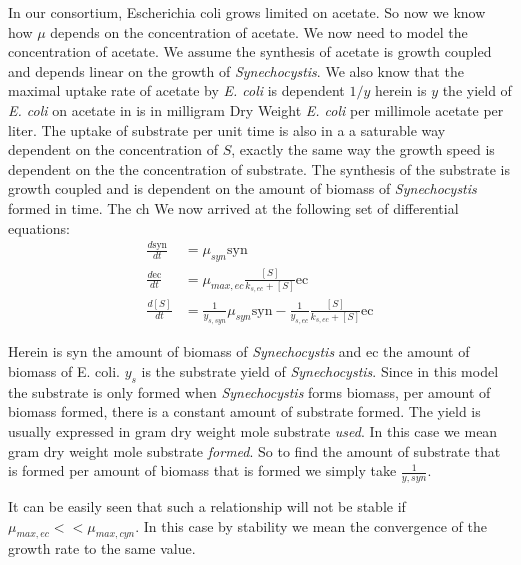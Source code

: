 \documentclass[10pt]{report}
\begin{document}
In our consortium, Escherichia coli grows limited on acetate. So now we know how $\mu$ depends on the concentration of acetate. We now need to model the concentration of acetate. We assume the synthesis of acetate is growth coupled and depends linear on the growth of \textit{Synechocystis}. We also know that the maximal uptake rate of acetate by \textit{E. coli} is dependent $1/y$ herein is $y$ the yield of \textit{E. coli} on acetate in is in milligram Dry Weight \textit{E. coli} per millimole acetate per liter. The uptake of substrate per unit time is also in a a saturable way dependent on the concentration of $S$, exactly the same way the growth speed is dependent on the the concentration of substrate. The synthesis of the substrate is growth coupled  and is dependent on the amount of biomass of \textit{Synechocystis} formed in time. The ch  We now arrived at the following set of differential equations:
\begin{align} \label{eq:ow}
 \frac{d\text{syn}}{dt} &= \mu_{syn}\text{syn} \\
 \frac{d\text{ec}}{dt} &= \mu_{max,ec} \frac{[S]}{k_{s,ec}+[S]} \text{ec} \\
 \frac{d[S]}{dt} &= \frac{1}{y_{s,syn}} \mu_{syn} \text{syn} - \frac{1}{y_{s,ec}} \frac{[S]}{k_{s,ec}+[S]} \text{ec}
\end{align}

Herein is syn the amount of biomass of \textit{Synechocystis} and ec the amount of biomass of E. coli. $y_s$ is the substrate yield of \textit{Synechocystis}. Since in this model the substrate is only formed when \textit{Synechocystis} forms biomass, per amount of biomass formed, there is a constant amount of substrate formed. The yield is usually expressed in gram dry weight mole substrate \emph{used}. In this case we mean gram dry weight mole substrate \emph{formed}. So to find the amount of substrate that is formed per amount of biomass that is formed we simply take $\frac{1}{y,syn}$.

It can be easily seen that such a relationship will not be stable if $\mu_{max,ec}<<\mu_{max,cyn}$. In this case by stability we mean the convergence of the growth rate to the same value.
\end{document}
